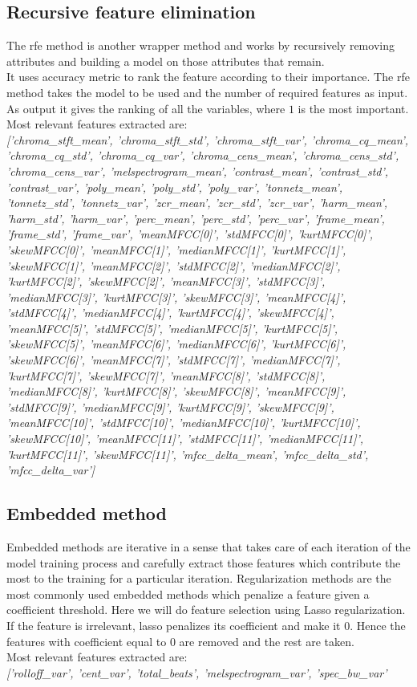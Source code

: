 \subsection{Recursive feature elimination}
The \gls{rfe} method is another wrapper method and works by recursively removing attributes and building a model on those attributes that remain.
\\
It uses accuracy metric to rank the feature according to their importance. The \gls{rfe} method takes the model to be used and the number of required features as input. As output it gives the ranking of all the variables, where $1$ is the most important.
\\
Most relevant features extracted are:
\\ \linebreak 
\textit{['chroma\_stft\_mean', 'chroma\_stft\_std', 'chroma\_stft\_var', 'chroma\_cq\_mean', 'chroma\_cq\_std', 'chroma\_cq\_var', 'chroma\_cens\_mean', 'chroma\_cens\_std', 'chroma\_cens\_var', 'melspectrogram\_mean', 'contrast\_mean', 'contrast\_std', 'contrast\_var', 'poly\_mean', 'poly\_std', 'poly\_var', 'tonnetz\_mean', 'tonnetz\_std', 'tonnetz\_var', 'zcr\_mean', 'zcr\_std', 'zcr\_var', 'harm\_mean', 'harm\_std', 'harm\_var', 'perc\_mean', 'perc\_std', 'perc\_var', 'frame\_mean', 'frame\_std',  'frame\_var', 'meanMFCC[0]', 'stdMFCC[0]', 'kurtMFCC[0]', 'skewMFCC[0]', 'meanMFCC[1]', 'medianMFCC[1]', 'kurtMFCC[1]', 'skewMFCC[1]', 'meanMFCC[2]', 'stdMFCC[2]', 'medianMFCC[2]', 'kurtMFCC[2]', 'skewMFCC[2]', 'meanMFCC[3]', 'stdMFCC[3]', 'medianMFCC[3]', 'kurtMFCC[3]', 'skewMFCC[3]', 'meanMFCC[4]', 'stdMFCC[4]', 'medianMFCC[4]', 'kurtMFCC[4]', 'skewMFCC[4]', 'meanMFCC[5]', 'stdMFCC[5]', 'medianMFCC[5]', 'kurtMFCC[5]', 'skewMFCC[5]', 'meanMFCC[6]', 'medianMFCC[6]', 'kurtMFCC[6]', 'skewMFCC[6]', 'meanMFCC[7]', 'stdMFCC[7]', 'medianMFCC[7]', 'kurtMFCC[7]', 'skewMFCC[7]', 'meanMFCC[8]', 'stdMFCC[8]', 'medianMFCC[8]',  'kurtMFCC[8]', 'skewMFCC[8]', 'meanMFCC[9]', 'stdMFCC[9]', 'medianMFCC[9]', 'kurtMFCC[9]', 'skewMFCC[9]', 'meanMFCC[10]', 'stdMFCC[10]', 'medianMFCC[10]', 'kurtMFCC[10]', 'skewMFCC[10]', 'meanMFCC[11]', 'stdMFCC[11]', 'medianMFCC[11]', 'kurtMFCC[11]', 'skewMFCC[11]', 'mfcc\_delta\_mean', 'mfcc\_delta\_std', 'mfcc\_delta\_var']}

\subsection{Embedded method}
Embedded methods are iterative in a sense that takes care of each iteration of the model training process and carefully extract those features which contribute the most to the training for a particular iteration. Regularization methods are the most commonly used embedded methods which penalize a feature given a coefficient threshold.
Here we will do feature selection using Lasso regularization. If the feature is irrelevant, lasso penalizes its coefficient and make it $0$. Hence the features with coefficient equal to $0$ are removed and the rest are taken.
\\
Most relevant features extracted are:
\\ \linebreak 
\textit{['rolloff\_var', 'cent\_var', 'total\_beats', 'melspectrogram\_var', 'spec\_bw\_var'}


